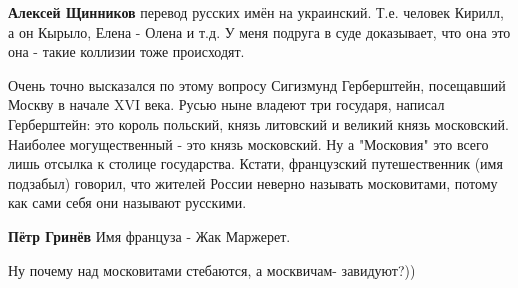 \begin{itemize}
\begin{itemize}
 
\textbf{Алексей Щинников} перевод русских имён на украинский. Т.е. человек Кирилл, а он Кырыло, Елена - Олена и т.д. У меня подруга в суде доказывает, что она это она - такие коллизии тоже происходят.
\end{itemize}

 

Очень точно высказался по этому вопросу Сигизмунд Герберштейн, посещавший Москву
в начале XVI века. Русью ныне владеют три государя, написал Герберштейн: это
король польский, князь литовский и великий князь московский. Наиболее
могущественный - это князь московский. Ну а "Московия" это всего лишь отсылка к
столице государства. Кстати, французский путешественник (имя подзабыл) говорил, что
жителей России неверно называть московитами, потому как сами себя они называют
русскими.

\begin{itemize}
 
\textbf{Пётр Гринёв} Имя француза - Жак Маржерет.
\end{itemize}

 
Ну почему над московитами стебаются, а москвичам- завидуют?))

\begin{itemize}
 

\end{itemize}
\end{itemize}

